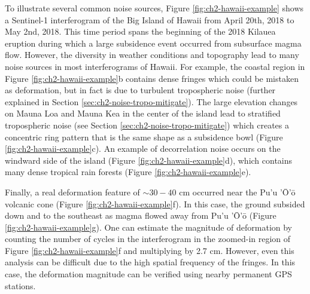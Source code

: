To illustrate several common noise sources, Figure \ref{fig:ch2-hawaii-example} shows a Sentinel-1 interferogram of the Big Island of Hawaii from April 20th, 2018 to May 2nd, 2018. 
This time period spans the beginning of the 2018 Kilauea eruption during which a large subsidence event occurred from subsurface magma flow. However, the diversity in weather conditions and topography lead to many noise sources in most interferograms of Hawaii.
For example, the coastal region in Figure \ref{fig:ch2-hawaii-example}b contains dense fringes which could be mistaken as deformation, but in fact is due to turbulent tropospheric noise (further explained in Section \ref{sec:ch2-noise-tropo-mitigate}).
The large elevation changes on Mauna Loa and Mauna Kea in the center of the island lead to stratified tropospheric noise (see Section \ref{sec:ch2-noise-tropo-mitigate}) which creates a concentric ring pattern that is the same shape as a subsidence bowl (Figure \ref{fig:ch2-hawaii-example}c).
An example of decorrelation noise occurs on the windward side of the island (Figure \ref{fig:ch2-hawaii-example}d), which contains many dense tropical rain forests (Figure \ref{fig:ch2-hawaii-example}e). 

Finally, a real deformation feature of $ \sim 30-40 $ cm occurred near the Pu'u '\=O'\=o volcanic cone (Figure \ref{fig:ch2-hawaii-example}f).
In this case, the ground subsided down and to the southeast as magma flowed away from Pu'u '\=O'\=o (Figure \ref{fig:ch2-hawaii-example}g).
One can estimate the magnitude of deformation by counting the number of cycles in the interferogram in the zoomed-in region of Figure \ref{fig:ch2-hawaii-example}f and multiplying by 2.7 cm.
However, even this analysis can be difficult due to the high spatial frequency of the fringes.
In this case, the deformation magnitude can be verified using nearby permanent GPS stations.


%



